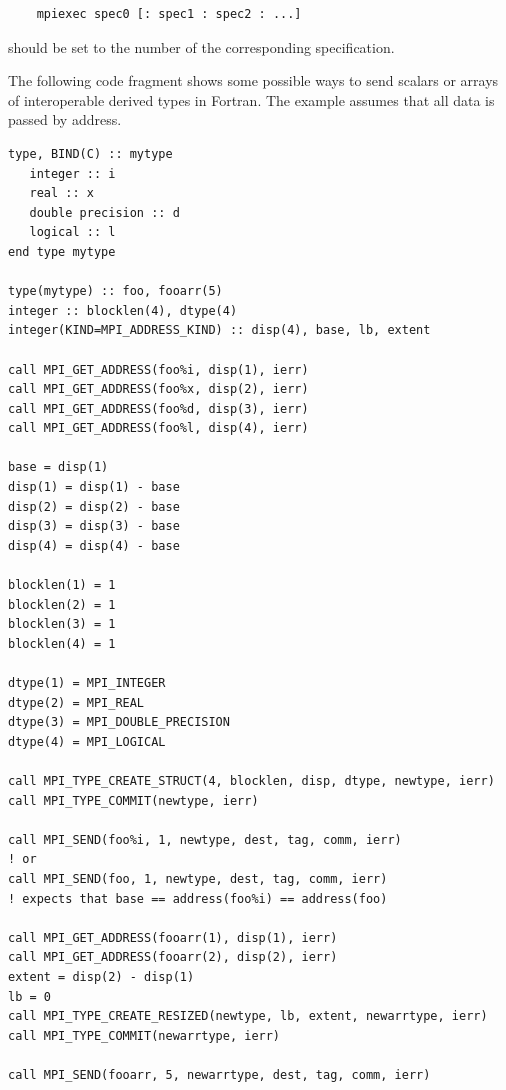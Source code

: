 \begin{example}
\begin{verbatim}
    mpiexec spec0 [: spec1 : spec2 : ...]
\end{verbatim}
 should be set to the number of the corresponding
specification.


The following code fragment shows
some possible ways to send scalars or arrays of interoperable
derived types in Fortran. The example assumes that all data is passed by address.
%
%
%
%
%
\begin{lstlisting}[language={[MPI]Fortran}]
type, BIND(C) :: mytype
   integer :: i
   real :: x
   double precision :: d
   logical :: l
end type mytype

type(mytype) :: foo, fooarr(5)
integer :: blocklen(4), dtype(4)
integer(KIND=MPI_ADDRESS_KIND) :: disp(4), base, lb, extent

call MPI_GET_ADDRESS(foo%i, disp(1), ierr)
call MPI_GET_ADDRESS(foo%x, disp(2), ierr)
call MPI_GET_ADDRESS(foo%d, disp(3), ierr)
call MPI_GET_ADDRESS(foo%l, disp(4), ierr)

base = disp(1)
disp(1) = disp(1) - base
disp(2) = disp(2) - base
disp(3) = disp(3) - base
disp(4) = disp(4) - base

blocklen(1) = 1
blocklen(2) = 1
blocklen(3) = 1
blocklen(4) = 1

dtype(1) = MPI_INTEGER
dtype(2) = MPI_REAL
dtype(3) = MPI_DOUBLE_PRECISION
dtype(4) = MPI_LOGICAL

call MPI_TYPE_CREATE_STRUCT(4, blocklen, disp, dtype, newtype, ierr)
call MPI_TYPE_COMMIT(newtype, ierr)

call MPI_SEND(foo%i, 1, newtype, dest, tag, comm, ierr)
! or
call MPI_SEND(foo, 1, newtype, dest, tag, comm, ierr)
! expects that base == address(foo%i) == address(foo)

call MPI_GET_ADDRESS(fooarr(1), disp(1), ierr)
call MPI_GET_ADDRESS(fooarr(2), disp(2), ierr)
extent = disp(2) - disp(1)
lb = 0
call MPI_TYPE_CREATE_RESIZED(newtype, lb, extent, newarrtype, ierr)
call MPI_TYPE_COMMIT(newarrtype, ierr)

call MPI_SEND(fooarr, 5, newarrtype, dest, tag, comm, ierr)
\end{lstlisting}
%
%
%
%


\end{example}
